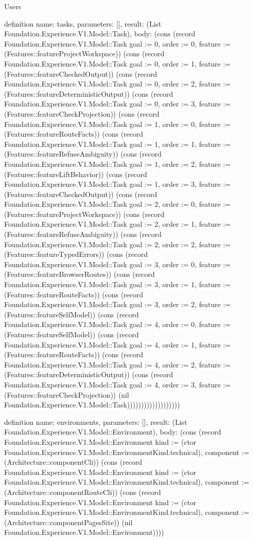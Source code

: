 \begin{lexlean}{Users}
\begin{semanticmodule}
definition{
  name: tasks,
  parameters: [],
  result: (List Foundation.Experience.V1.Model::Task),
  body: (cons (record Foundation.Experience.V1.Model::Task {goal := 0, order := 0, feature := (Features::featureProjectWorkspace)}) (cons (record Foundation.Experience.V1.Model::Task {goal := 0, order := 1, feature := (Features::featureCheckedOutput)}) (cons (record Foundation.Experience.V1.Model::Task {goal := 0, order := 2, feature := (Features::featureDeterministicOutput)}) (cons (record Foundation.Experience.V1.Model::Task {goal := 0, order := 3, feature := (Features::featureCheckProjection)}) (cons (record Foundation.Experience.V1.Model::Task {goal := 1, order := 0, feature := (Features::featureRouteFacts)}) (cons (record Foundation.Experience.V1.Model::Task {goal := 1, order := 1, feature := (Features::featureRefuseAmbiguity)}) (cons (record Foundation.Experience.V1.Model::Task {goal := 1, order := 2, feature := (Features::featureLiftBehavior)}) (cons (record Foundation.Experience.V1.Model::Task {goal := 1, order := 3, feature := (Features::featureCheckedOutput)}) (cons (record Foundation.Experience.V1.Model::Task {goal := 2, order := 0, feature := (Features::featureProjectWorkspace)}) (cons (record Foundation.Experience.V1.Model::Task {goal := 2, order := 1, feature := (Features::featureRefuseAmbiguity)}) (cons (record Foundation.Experience.V1.Model::Task {goal := 2, order := 2, feature := (Features::featureTypedErrors)}) (cons (record Foundation.Experience.V1.Model::Task {goal := 3, order := 0, feature := (Features::featureBrowserRoutes)}) (cons (record Foundation.Experience.V1.Model::Task {goal := 3, order := 1, feature := (Features::featureRouteFacts)}) (cons (record Foundation.Experience.V1.Model::Task {goal := 3, order := 2, feature := (Features::featureSelfModel)}) (cons (record Foundation.Experience.V1.Model::Task {goal := 4, order := 0, feature := (Features::featureSelfModel)}) (cons (record Foundation.Experience.V1.Model::Task {goal := 4, order := 1, feature := (Features::featureRouteFacts)}) (cons (record Foundation.Experience.V1.Model::Task {goal := 4, order := 2, feature := (Features::featureDeterministicOutput)}) (cons (record Foundation.Experience.V1.Model::Task {goal := 4, order := 3, feature := (Features::featureCheckProjection)}) (nil Foundation.Experience.V1.Model::Task)))))))))))))))))))
}

definition{
  name: environments,
  parameters: [],
  result: (List Foundation.Experience.V1.Model::Environment),
  body: (cons (record Foundation.Experience.V1.Model::Environment {kind := (ctor Foundation.Experience.V1.Model::EnvironmentKind.technical), component := (Architecture::componentCli)}) (cons (record Foundation.Experience.V1.Model::Environment {kind := (ctor Foundation.Experience.V1.Model::EnvironmentKind.technical), component := (Architecture::componentRouteCli)}) (cons (record Foundation.Experience.V1.Model::Environment {kind := (ctor Foundation.Experience.V1.Model::EnvironmentKind.technical), component := (Architecture::componentPagesSite)}) (nil Foundation.Experience.V1.Model::Environment))))
}


\end{semanticmodule}
\end{lexlean}
